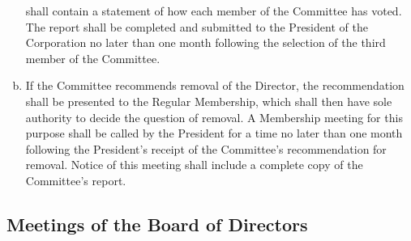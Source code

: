 \begin{enumerate}[a.]
  shall contain a statement of how each member of the Committee has
  voted. The report shall be completed and submitted to the President
  of the Corporation no later than one month following the selection
  of the third member of the Committee.
\item If the Committee recommends removal of the Director, the
  recommendation shall be presented to the Regular Membership, which
  shall then have sole authority to decide the question of removal. A
  Membership meeting for this purpose shall be called by the President
  for a time no later than one month following the President’s receipt
  of the Committee’s recommendation for removal. Notice of this
  meeting shall include a complete copy of the Committee’s report.
\end{enumerate}

\subsection{Meetings of the Board of Directors}
